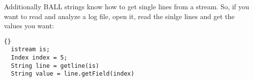 Additionally BALL strings know how to get single lines from a stream. So, if
you want to read and analyze a log file, open it, read the sinlge lines and
get the values you want:
\begin{lstlisting}{}
  istream is;
  Index index = 5;
  String line = getline(is)
  String value = line.getField(index)
\end{lstlisting}{}
